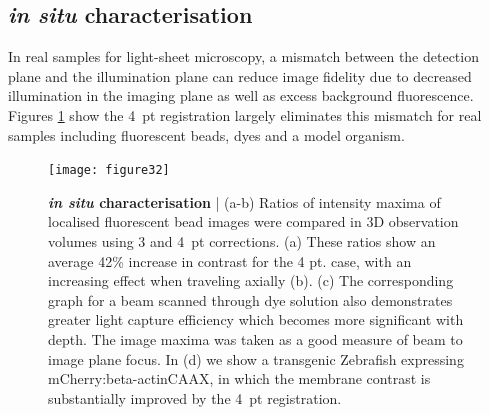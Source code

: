 \subsection{\emph{in situ} characterisation}

In real samples for
light-sheet microscopy, %
a mismatch between the detection plane and the illumination plane %
can %
reduce image fidelity due to decreased illumination in the imaging plane as well as
excess background fluorescence.
Figures \ref{fig:3} show the 4~pt registration largely eliminates this %
mismatch for real samples including fluorescent beads, dyes and a model organism.

\begin{figure}[h]
  \texttt{[image: figure32]}
  \caption{\textbf{\emph{in situ} characterisation} |
  (a-b) Ratios of intensity maxima of localised fluorescent bead images
  were compared in 3D observation volumes %
  using 3 and 4~pt corrections. (a) These ratios show an %
  average 42\% increase in contrast for the 4 pt. case, %
  with an increasing effect when traveling axially (b).
  (c) The corresponding graph for a beam scanned through dye solution also demonstrates greater light capture efficiency which becomes more significant with depth. The image maxima was taken as a good measure of beam to image plane focus.
  In (d) we show a transgenic Zebrafish expressing mCherry:beta-actinCAAX, in which the membrane contrast is substantially improved by the 4~pt registration.%
  }
  \label{fig:3}
\end{figure}

